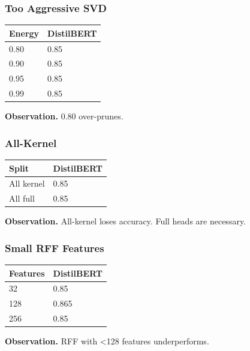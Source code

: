 \subsubsection{Too Aggressive SVD}

\begin{table}[H]
\centering
\small
\begin{tabular}{ll}
\toprule
\textbf{Energy} & \textbf{DistilBERT} \\
\midrule
0.80 & 0.85 \\
0.90 & 0.85 \\
0.95 & 0.85 \\
0.99 & 0.85 \\
\bottomrule
\end{tabular}
\end{table}

\textbf{Observation.} 0.80 over-prunes.

\subsubsection{All-Kernel}

\begin{table}[H]
\centering
\small
\begin{tabular}{ll}
\toprule
\textbf{Split} & \textbf{DistilBERT} \\
\midrule
All kernel & 0.85 \\
All full & 0.85 \\
\bottomrule
\end{tabular}
\end{table}

\textbf{Observation.} All-kernel loses accuracy. Full heads are necessary.

\subsubsection{Small RFF Features}

\begin{table}[H]
\centering
\small
\begin{tabular}{ll}
\toprule
\textbf{Features} & \textbf{DistilBERT} \\
\midrule
32 & 0.85 \\
128 & 0.865 \\
256 & 0.85 \\
\bottomrule
\end{tabular}
\end{table}

\textbf{Observation.} RFF with \textless{}128 features underperforms.

